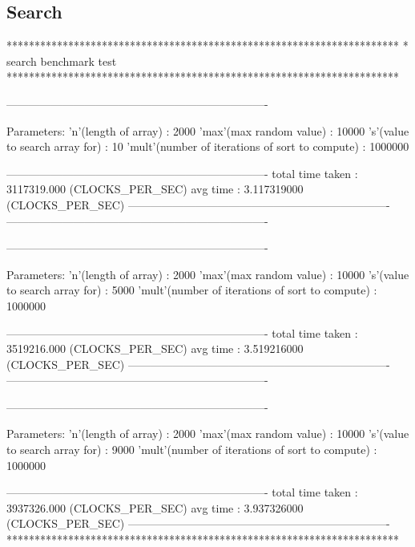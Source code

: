 \documentclass[a4paper]{article}
\begin{document}
\subsection{Search}
\begin{verbatimtab}[4]
**********************************************************************
* search benchmark test
**********************************************************************

----------------------------------------------------------------------

	Parameters:
		'n'(length of array) 				:	2000
		'max'(max random value) 			:	10000
		's'(value to search array for) 			:	10
		'mult'(number of iterations of sort to compute) :	1000000


----------------------------------------------------------------------
total time taken 	: 3117319.000 (CLOCKS_PER_SEC)
avg time 		: 3.117319000 (CLOCKS_PER_SEC)
----------------------------------------------------------------------
----------------------------------------------------------------------

----------------------------------------------------------------------

	Parameters:
		'n'(length of array) 				:	2000
		'max'(max random value) 			:	10000
		's'(value to search array for) 			:	5000
		'mult'(number of iterations of sort to compute) :	1000000


----------------------------------------------------------------------
total time taken 	: 3519216.000 (CLOCKS_PER_SEC)
avg time 		: 3.519216000 (CLOCKS_PER_SEC)
----------------------------------------------------------------------
----------------------------------------------------------------------

----------------------------------------------------------------------

	Parameters:
		'n'(length of array) 				:	2000
		'max'(max random value) 			:	10000
		's'(value to search array for) 			:	9000
		'mult'(number of iterations of sort to compute) :	1000000


----------------------------------------------------------------------
total time taken 	: 3937326.000 (CLOCKS_PER_SEC)
avg time 		: 3.937326000 (CLOCKS_PER_SEC)
----------------------------------------------------------------------
**********************************************************************
\end{verbatimtab}
\end{document}
